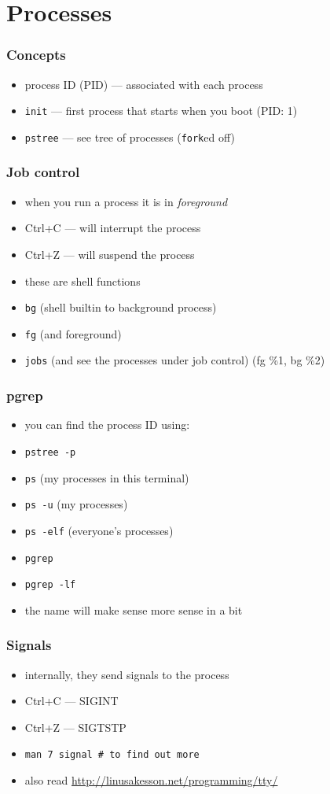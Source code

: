 \documentclass[%
        hyperref={%
                pdfauthor={Zakariyya Mughal},%
                pdfpagemode={None},pdfpagelayout={SinglePage}}%
        xcolor={x11names},%
]{beamer}
\begin{document}
\section{Processes}\frame{\insertsection}
\begin{frame}
	\frametitle{Concepts}
	\begin{itemize}
		\item process ID (PID) --- associated with each
			process
		\item \texttt{init} --- first process that starts when you
			boot (PID: 1)
		\item \texttt{pstree} --- see tree of processes
			(\texttt{fork}ed off)
	\end{itemize}
\end{frame}
\begin{frame}
	\frametitle{Job control}
	\begin{itemize}
		\item when you run a process it is in \emph{foreground}
		\item Ctrl+C --- will interrupt the process
		\item Ctrl+Z --- will suspend the process
		\pause\item these are shell functions
		\pause\item \texttt{bg} (shell builtin to background
			process)
		\pause\item \texttt{fg} (and foreground)
		\pause\item \texttt{jobs} (and see the processes under
			job control) (fg \%1, bg \%2)
	\end{itemize}
\end{frame}
\begin{frame}
	\frametitle{pgrep}
	\begin{itemize}
		\item you can find the process ID using:
		\item \texttt{pstree -p}
		\item \texttt{ps} (my processes in this terminal)
		\item \texttt{ps -u} (my processes)
		\item \texttt{ps -elf} (everyone's processes)
		\pause\item \texttt{pgrep}
		\item \texttt{pgrep -lf}
		\item the name will make sense more sense in a bit
	\end{itemize}
\end{frame}
\begin{frame}
	\frametitle{Signals}
	\begin{itemize}
		\item internally, they send signals to the process
		\item Ctrl+C --- SIGINT
		\item Ctrl+Z --- SIGTSTP
		\pause\item \texttt{man 7 signal \# to find out more}
		\item also read \url{http://linusakesson.net/programming/tty/}
	\end{itemize}
\end{frame}
\end{document}
